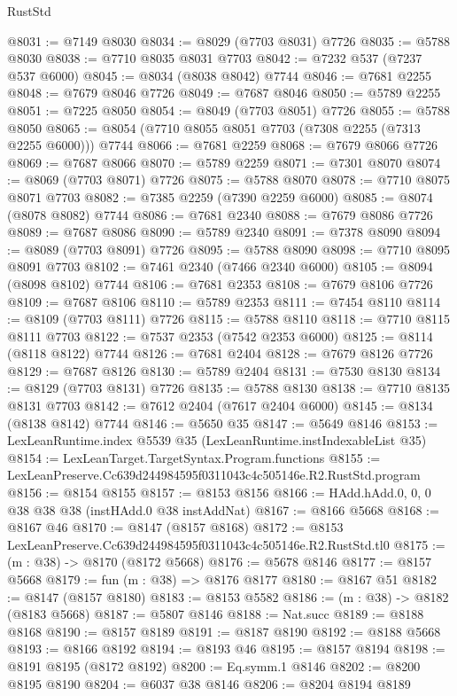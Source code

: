 \begin{lexlean}{RustStd}
\begin{coremodule}
@8031 := @7149 @8030
@8034 := @8029 (@7703 @8031) @7726
@8035 := @5788 @8030
@8038 := @7710 @8035 @8031 @7703
@8042 := @7232 @537 (@7237 @537 @6000)
@8045 := @8034 (@8038 @8042) @7744
@8046 := @7681 @2255
@8048 := @7679 @8046 @7726
@8049 := @7687 @8046
@8050 := @5789 @2255
@8051 := @7225 @8050
@8054 := @8049 (@7703 @8051) @7726
@8055 := @5788 @8050
@8065 := @8054 (@7710 @8055 @8051 @7703 (@7308 @2255 (@7313 @2255 @6000))) @7744
@8066 := @7681 @2259
@8068 := @7679 @8066 @7726
@8069 := @7687 @8066
@8070 := @5789 @2259
@8071 := @7301 @8070
@8074 := @8069 (@7703 @8071) @7726
@8075 := @5788 @8070
@8078 := @7710 @8075 @8071 @7703
@8082 := @7385 @2259 (@7390 @2259 @6000)
@8085 := @8074 (@8078 @8082) @7744
@8086 := @7681 @2340
@8088 := @7679 @8086 @7726
@8089 := @7687 @8086
@8090 := @5789 @2340
@8091 := @7378 @8090
@8094 := @8089 (@7703 @8091) @7726
@8095 := @5788 @8090
@8098 := @7710 @8095 @8091 @7703
@8102 := @7461 @2340 (@7466 @2340 @6000)
@8105 := @8094 (@8098 @8102) @7744
@8106 := @7681 @2353
@8108 := @7679 @8106 @7726
@8109 := @7687 @8106
@8110 := @5789 @2353
@8111 := @7454 @8110
@8114 := @8109 (@7703 @8111) @7726
@8115 := @5788 @8110
@8118 := @7710 @8115 @8111 @7703
@8122 := @7537 @2353 (@7542 @2353 @6000)
@8125 := @8114 (@8118 @8122) @7744
@8126 := @7681 @2404
@8128 := @7679 @8126 @7726
@8129 := @7687 @8126
@8130 := @5789 @2404
@8131 := @7530 @8130
@8134 := @8129 (@7703 @8131) @7726
@8135 := @5788 @8130
@8138 := @7710 @8135 @8131 @7703
@8142 := @7612 @2404 (@7617 @2404 @6000)
@8145 := @8134 (@8138 @8142) @7744
@8146 := @5650 @35
@8147 := @5649 @8146
@8153 := LexLeanRuntime.index @5539 @35 (LexLeanRuntime.instIndexableList @35)
@8154 := LexLeanTarget.TargetSyntax.Program.functions
@8155 := LexLeanPreserve.Cc639d244984595f0311043c4c505146e.R2.RustStd.program
@8156 := @8154 @8155
@8157 := @8153 @8156
@8166 := HAdd.hAdd.{0, 0, 0} @38 @38 @38 (instHAdd.{0} @38 instAddNat)
@8167 := @8166 @5668
@8168 := @8167 @46
@8170 := @8147 (@8157 @8168)
@8172 := @8153 LexLeanPreserve.Cc639d244984595f0311043c4c505146e.R2.RustStd.tl0
@8175 := (m : @38) -> @8170 (@8172 @5668)
@8176 := @5678 @8146
@8177 := @8157 @5668
@8179 := fun (m : @38) => @8176 @8177
@8180 := @8167 @51
@8182 := @8147 (@8157 @8180)
@8183 := @8153 @5582
@8186 := (m : @38) -> @8182 (@8183 @5668)
@8187 := @5807 @8146
@8188 := Nat.succ
@8189 := @8188 @8168
@8190 := @8157 @8189
@8191 := @8187 @8190
@8192 := @8188 @5668
@8193 := @8166 @8192
@8194 := @8193 @46
@8195 := @8157 @8194
@8198 := @8191 @8195 (@8172 @8192)
@8200 := Eq.symm.{1} @8146
@8202 := @8200 @8195 @8190
@8204 := @6037 @38 @8146
@8206 := @8204 @8194 @8189

\end{coremodule}
\end{lexlean}
